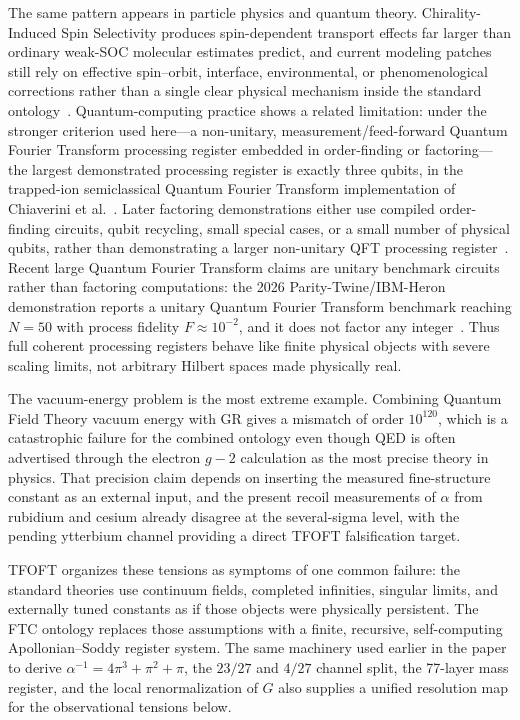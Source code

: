 \documentclass[11pt,a4paper]{article}
\begin{document}
The same pattern appears in particle physics and quantum theory. Chirality-Induced Spin Selectivity produces spin-dependent transport effects far larger than ordinary weak-SOC molecular estimates predict, and current modeling patches still rely on effective spin--orbit, interface, environmental, or phenomenological corrections rather than a single clear physical mechanism inside the standard ontology~\cite{Evers2022CISS,Bloom2024CISS,Sala2026CISS}. Quantum-computing practice shows a related limitation: under the stronger criterion used here---a non-unitary, measurement/feed-forward Quantum Fourier Transform processing register embedded in order-finding or factoring---the largest demonstrated processing register is exactly three qubits, in the trapped-ion semiclassical Quantum Fourier Transform implementation of Chiaverini et al.~\cite{GriffithsNiu1996,Chiaverini2005}. Later factoring demonstrations either use compiled order-finding circuits, qubit recycling, small special cases, or a small number of physical qubits, rather than demonstrating a larger non-unitary QFT processing register~\cite{Vandersypen2001,MartinLopez2012,Skosana2021,Monz2016}. Recent large Quantum Fourier Transform claims are unitary benchmark circuits rather than factoring computations: the 2026 Parity-Twine/IBM-Heron demonstration reports a unitary Quantum Fourier Transform benchmark reaching \(N=50\) with process fidelity \(F\approx10^{-2}\), and it does not factor any integer~\cite{Aumann2026QFT}. Thus full coherent processing registers behave like finite physical objects with severe scaling limits, not arbitrary Hilbert spaces made physically real.

The vacuum-energy problem is the most extreme example. Combining Quantum Field Theory vacuum energy with GR gives a mismatch of order \(10^{120}\), which is a catastrophic failure for the combined ontology even though QED is often advertised through the electron \(g-2\) calculation as the most precise theory in physics. That precision claim depends on inserting the measured fine-structure constant as an external input, and the present recoil measurements of \(\alpha\) from rubidium and cesium already disagree at the several-sigma level, with the pending ytterbium channel providing a direct TFOFT falsification target.

TFOFT organizes these tensions as symptoms of one common failure: the standard theories use continuum fields, completed infinities, singular limits, and externally tuned constants as if those objects were physically persistent. The FTC ontology replaces those assumptions with a finite, recursive, self-computing Apollonian--Soddy register system. The same machinery used earlier in the paper to derive \(\alpha^{-1}=4\pi^3+\pi^2+\pi\), the \(23/27\) and \(4/27\) channel split, the 77-layer mass register, and the local renormalization of \(G\) also supplies a unified resolution map for the observational tensions below.
\end{document}
